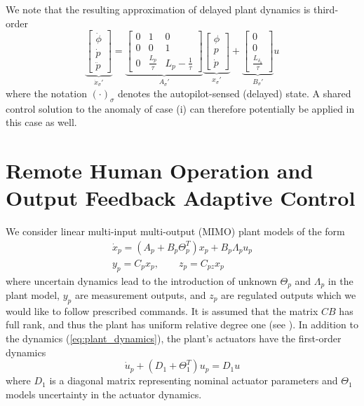 We note that the resulting approximation of delayed plant dynamics is third-order 
\begin{equation}
	\underbrace{\begin{bmatrix}
		\dot{\phi} \\ \dot{p} \\ \ddot{p}
	\end{bmatrix}}_{\dot{x}_\sigma'} = \underbrace{\begin{bmatrix}
		0 & 1 & 0\\ 0 & 0 & 1 \\ 0 & \frac{L_p}{\tau} & L_p - \frac{1}{\tau}
	\end{bmatrix}}_{A_\sigma'} \underbrace{\begin{bmatrix}
		\phi \\ p \\ \dot{p}
	\end{bmatrix}}_{x_\sigma'} + \underbrace{\begin{bmatrix}
		0 \\ 0 \\ \frac{L_{\delta_a}}{\tau}
	\end{bmatrix}}_{B_\sigma'} u
	\label{eqn:plant_3_tau}
\end{equation}
\noindent where the notation $(\cdot)_\sigma$ denotes the autopilot-sensed (delayed) state. A shared control solution to the anomaly of case (i) can therefore potentially be applied in this case as well.



\section{Remote Human Operation and Output Feedback Adaptive Control}
We consider linear multi-input multi-output (MIMO) plant models of the form
\begin{equation}
\begin{gathered}
\dot x_p = (A_p + B_p \Theta_p^T) x_p + B_p \Lambda_p u_p \\
y_p = C_p x_p, \qquad z_p = C_{pz} x_p \label{eq:plant_dynamics}
\end{gathered}
\end{equation}
where uncertain dynamics lead to the introduction of unknown $\Theta_p$ and $\Lambda_p$ in the plant model, $y_p$ are measurement outputs, and $z_p$ are regulated outputs which we would like to follow prescribed commands. It is assumed that the matrix $CB$ has full rank, and thus the plant has uniform relative degree one (see \cite{qu2016adaptive}). In addition to the dynamics (\ref{eq:plant_dynamics}), the plant's actuators have the first-order dynamics
\begin{equation}
	\dot{u}_p + (D_1 + \Theta_1^T) u_p = D_1 u \label{eq:first_order_act}
\end{equation}
where $D_1$ is a diagonal matrix representing nominal actuator parameters and $\Theta_1$ models uncertainty in the actuator dynamics. 

